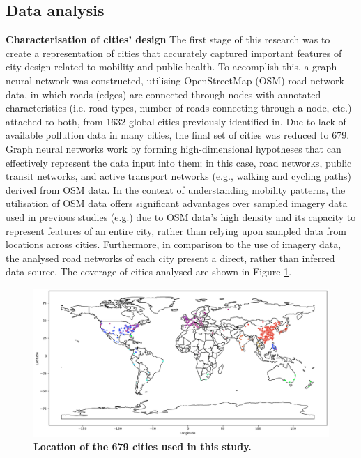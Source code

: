 \documentclass[preprint,12pt]{elsarticle}
\begin{document}
\subsection*{Data analysis}
\textbf{Characterisation of cities' design}
The first stage of this research was to create a representation of cities that accurately captured important features of city design related to mobility and public health. To accomplish this, a graph neural network was constructed, utilising OpenStreetMap (OSM) road network data\cite{Boeing2017a}, in which roads (edges) are connected through nodes with annotated characteristics (i.e. road types, number of roads connecting through a node, etc.) attached to both, from 1632 global cities previously identified in\cite{Thompson2020}. Due to lack of available pollution data in many cities, the final set of cities was reduced to 679. Graph neural networks work by forming high-dimensional hypotheses that can effectively represent the data input into them; in this case, road networks, public transit networks, and active transport networks (e.g., walking and cycling paths) derived from OSM data. In the context of understanding mobility patterns, the utilisation of OSM data offers significant advantages over sampled imagery data used in previous studies (e.g.\cite{Thompson2020,seneviratne2021self}) due to OSM data's high density and its capacity to represent features of an entire city, rather than relying upon sampled data from locations across cities. Furthermore, in comparison to the use of imagery data, the analysed road networks of each city present a direct, rather than inferred data source. The coverage of cities analysed are shown in Figure \ref{fig:clusters}.


\begin{figure}
\centering
\includegraphics[trim={0 0 0 0},clip,scale=0.4]{Images/ByCountry_map_Zeigler.png}
\caption{\bf Location of the 679 cities used in this study.}
 \label{fig:clusters}
\end{figure}
\end{document}
